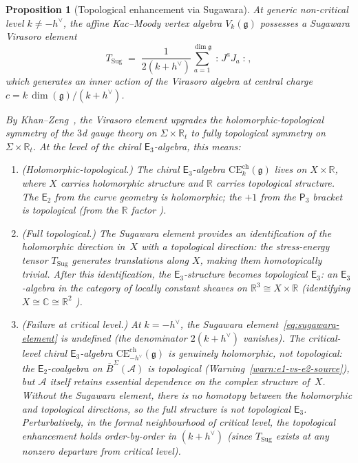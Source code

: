 \documentclass[11pt,reqno]{amsart}
\newtheorem{proposition}[theorem]{Proposition}
\theoremstyle{definition}
\theoremstyle{remark}
\newcommand{\cA}{\mathcal{A}}
\newcommand{\CE}{\mathrm{CE}}
\newcommand{\Etwo}{\mathsf{E}_{2}}
\newcommand{\Ethree}{\mathsf{E}_{3}}
\newcommand{\Pthree}{\mathsf{P}_{3}}
\newcommand{\fg}{\mathfrak{g}}
\newcommand{\BarSig}{\overline{B}^{\Sigma}}
\newcommand{\CC}{\mathbb{C}}
\newcommand{\RR}{\mathbb{R}}
\numberwithin{equation}{section}
\begin{document}
\begin{proposition}[Topological enhancement via Sugawara]
\label{prop:khan-zeng-topological}
At generic non-critical level $k \neq -h^\vee$, the affine
Kac--Moody vertex algebra $V_k(\fg)$ possesses a Sugawara
Virasoro element
\begin{equation}\label{eq:sugawara-element}
  T_{\mathrm{Sug}} \;=\;
  \frac{1}{2(k + h^\vee)}
  \sum_{a=1}^{\dim \fg}
  \mathopen{:} J^a J_a \mathclose{:},
\end{equation}
which generates an inner action of the Virasoro algebra at
central charge $c = k\,\dim(\fg)/(k + h^\vee)$.

By Khan--Zeng~\cite{KhanZeng25}, the Virasoro element
upgrades the holomorphic-topological symmetry of the $3$d
gauge theory on $\Sigma \times \RR_t$ to fully topological
symmetry on $\Sigma \times \RR_t$. At the level of the
chiral $\Ethree$-algebra, this means:
\begin{enumerate}[label=\textup{(\roman*)}]
\item \textup{(Holomorphic-topological.)}
  The chiral $\Ethree$-algebra
  $\CE^{\mathrm{ch}}_k(\fg)$ lives on $X \times \RR$,
  where $X$ carries holomorphic structure and $\RR$
  carries topological structure. The $\Etwo$ from the
  curve geometry is holomorphic; the $+1$ from the $\Pthree$
  bracket is topological \textup{(}from the $\RR$ factor%
  \textup{)}.
\item \textup{(Full topological.)}
  The Sugawara element provides an identification
  of the holomorphic direction in~$X$ with a topological
  direction: the stress-energy tensor $T_{\mathrm{Sug}}$
  generates translations along $X$, making them homotopically
  trivial. After this identification, the
  $\Ethree$-structure becomes \emph{topological} $\Ethree$:
  an $\Ethree$-algebra in the category of locally constant
  sheaves on $\RR^3 \cong X \times \RR$
  \textup{(}identifying $X \cong \CC \cong \RR^2$%
  \textup{)}.
\item \textup{(Failure at critical level.)}
  At $k = -h^\vee$, the Sugawara element~\eqref{eq:sugawara-element}
  is undefined \textup{(}the denominator $2(k+h^\vee)$
  vanishes\textup{)}. The critical-level chiral
  $\Ethree$-algebra $\CE^{\mathrm{ch}}_{-h^\vee}(\fg)$ is
  genuinely holomorphic, not topological: the
  $\Etwo$-coalgebra on $\BarSig(\cA)$ is topological
  (Warning~\ref{warn:e1-vs-e2-source}), but $\cA$
  itself retains essential dependence on the complex
  structure of~$X$.
  Without the Sugawara element, there is no homotopy
  between the holomorphic and topological directions,
  so the full structure is not topological $\Ethree$.
  Perturbatively, in the formal neighbourhood of critical level,
  the topological enhancement holds order-by-order in
  $(k + h^\vee)$ \textup{(}since $T_{\mathrm{Sug}}$ exists at
  any nonzero departure from critical level\textup{)}.
\end{enumerate}
\end{proposition}
\end{document}
